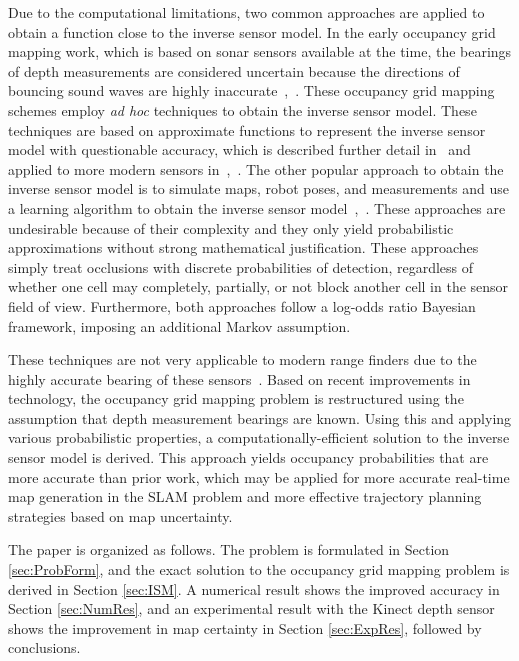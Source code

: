 \documentclass[letterpaper, 10pt, conference]{ieeeconf}
\begin{document}
Due to the computational limitations, two common approaches are applied to obtain a function close to the inverse sensor model.
In the early occupancy grid mapping work, which is based on sonar sensors available at the time, the bearings of depth measurements are considered uncertain because the directions of bouncing sound waves are highly inaccurate~\cite{MorElf85},~\cite{Elf89}.
These occupancy grid mapping schemes employ \emph{ad hoc} techniques to obtain the inverse sensor model.
These techniques are based on approximate functions to represent the inverse sensor model with questionable accuracy, which is described further detail in~\cite{ChoLynHutKanBurKavThr05} and applied to more modern sensors in~\cite{And09},~\cite{PirRutBisSch11}.
The other popular approach to obtain the inverse sensor model is to simulate maps, robot poses, and measurements and use a learning algorithm to obtain the inverse sensor model~\cite{Thr01},~\cite{ThrBurFox05}.
These approaches are undesirable because of their complexity and they only yield probabilistic approximations without strong mathematical justification.
These approaches simply treat occlusions with discrete probabilities of detection, regardless of whether one cell may completely, partially, or not block another cell in the sensor field of view.
Furthermore, both approaches follow a log-odds ratio Bayesian framework, imposing an additional Markov assumption.

These techniques are not very applicable to modern range finders due to the highly accurate bearing of these sensors~\cite{Thr03}.
Based on recent improvements in technology, the occupancy grid mapping problem is restructured using the assumption that depth measurement bearings are known.
Using this and applying various probabilistic properties, a computationally-efficient solution to the inverse sensor model is derived.
This approach yields occupancy probabilities that are more accurate than prior work, which may be applied for more accurate real-time map generation in the SLAM problem and more effective trajectory planning strategies based on map uncertainty.

The paper is organized as follows.
The problem is formulated in Section \ref{sec:ProbForm}, and the exact solution to the occupancy grid mapping problem is derived in Section \ref{sec:ISM}.
A numerical result shows the improved accuracy in Section \ref{sec:NumRes}, and an experimental result with the Kinect depth sensor shows the improvement in map certainty in Section \ref{sec:ExpRes}, followed by conclusions.
\end{document}
